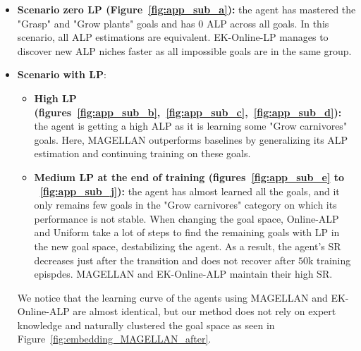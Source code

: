 \begin{itemize}
    \item\textbf{Scenario zero LP (Figure~\ref{fig:app_sub_a}):} the agent has mastered the "Grasp" and "Grow plants" goals and has $0$ ALP across all goals. In this scenario, all ALP estimations are equivalent. EK-Online-LP manages to discover new ALP niches faster as all impossible goals are in the same group.
    \item\textbf{Scenario with LP}:
    \begin{itemize}
        \item \textbf{High LP (figures~\ref{fig:app_sub_b},~\ref{fig:app_sub_c},~\ref{fig:app_sub_d}):} the agent is getting a high ALP as it is learning some "Grow carnivores" goals. Here, MAGELLAN outperforms baselines by generalizing its ALP estimation and continuing training on these goals.
        \item \textbf{Medium LP at the end of training (figures~\ref{fig:app_sub_e} to ~\ref{fig:app_sub_j}):} the agent has almost learned all the goals, and it only remains few goals in the "Grow carnivores" category on which its performance is not stable. When changing the goal space, Online-ALP and Uniform take a lot of steps to find the remaining goals with LP in the new goal space, destabilizing the agent. As a result, the agent's SR decreases just after the transition and does not recover after $50$k training epispdes. MAGELLAN and EK-Online-ALP maintain their high SR.
    \end{itemize}
    We notice that the learning curve of the agents using MAGELLAN and EK-Online-ALP are almost identical, but our method does not rely on expert knowledge and naturally clustered the goal space as seen in Figure~\ref{fig:embedding_MAGELLAN_after}.
\end{itemize}


